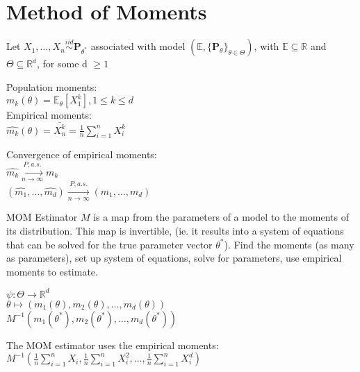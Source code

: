 \section{Method of Moments}

Let $X_1, \ldots , X_ n \stackrel{iid}{\sim } \mathbf{P}_{\theta ^*}$ associated with model $(\mathbb {E}, \{ \mathbf{P}_{\theta }\} _{\theta \in \Theta })$, with $\mathbb {E} \subseteq \mathbb {R}$ and $\Theta \subseteq \mathbb {R^d}$, for some d $\geq 1$

Population moments:\\

$m_k(\theta) = \mathbb{E}_{\theta}[X^k_1],  1 \leq k \leq d$\\

Empirical moments:\\

$\widehat{m_k}(\theta) = \bar{X_n^k} = \frac{1}{n} \sum _{i=1}^{n}X_i^k$

Convergence of empirical moments:\\

$\widehat{m_k} \xrightarrow[n \rightarrow \infty]{P, a.s.} m_k$\\

$(\widehat{m_1}, \ldots, \widehat{m_d}) \xrightarrow[n \rightarrow \infty]{P, a.s.} (m_1, \ldots, m_d)$

MOM Estimator $M$ is a map from the parameters of a model to the moments of its distribution. This map is invertible, (ie. it results into a system of equations that can be solved for the true parameter vector $\theta^{*}$). Find the moments (as many as parameters), set up system of equations, solve for parameters, use empirical moments to estimate.

$\displaystyle  \psi : \Theta \displaystyle \to \mathbb {R}^ d$\\

$\displaystyle \theta \displaystyle \mapsto (m_1(\theta ), m_2(\theta ), \ldots , m_ d(\theta ))$\\

$M ^{-1}(m_1(\theta ^*), m_2(\theta ^*), \ldots , m_ d(\theta ^*))$

The MOM estimator uses the empirical moments:\\

$M ^{-1}\left( \frac{1}{n} \sum _{i = 1}^ n X_ i, \frac{1}{n} \sum _{i = 1}^ n X_ i^2, \ldots , \frac{1}{n} \sum _{i = 1}^ n X_ i^ d \right)$\\



